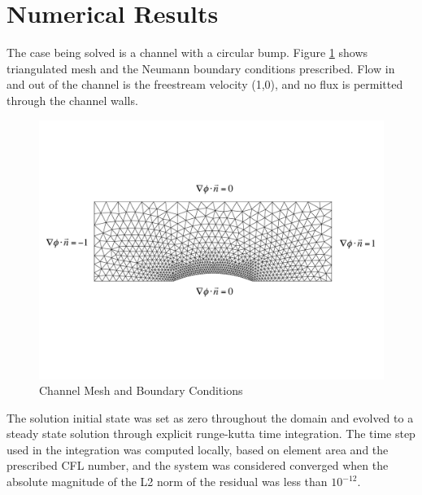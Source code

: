 \documentclass[a4paper]{article}
\begin{document}
\section{Numerical Results}
The case being solved is a channel with a circular bump.  Figure
\ref{fig:boundary-conditions} shows triangulated mesh and the Neumann boundary conditions
prescribed.  Flow in and out of the channel is the freestream velocity (1,0),
and no flux is permitted through the channel walls.
\begin{figure}[h]
  \centering
  \includegraphics[width=\textwidth,trim={0 4cm 0 4cm},clip]{figures/boundary_conditions}
  \caption{Channel Mesh and Boundary Conditions}
  \label{fig:boundary-conditions}
\end{figure}
The solution initial state was set as zero throughout the domain and evolved to
a steady state solution through explicit runge-kutta time integration.  The
time step used in the integration was computed locally, based on element area
and the prescribed CFL number, and the system was considered converged when the
absolute magnitude of the L2 norm of the residual was less than $10^{-12}$.

\end{document}
